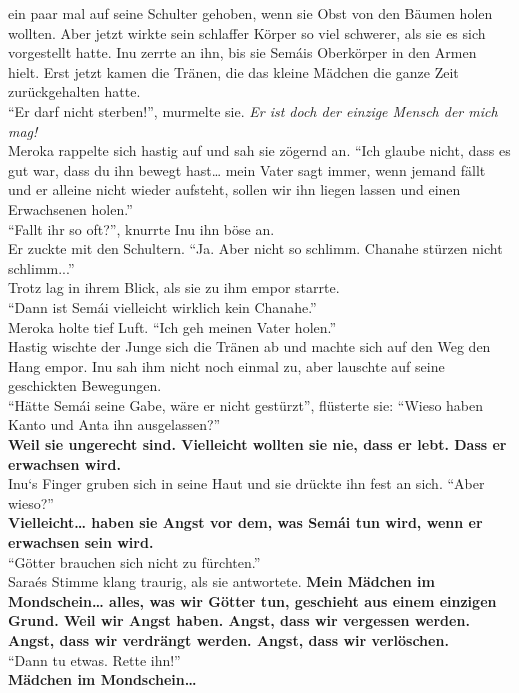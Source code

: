 \documentclass[a4paper,12pt]{book}
\begin{document}
ein paar mal auf seine Schulter gehoben, wenn sie Obst von den Bäumen holen wollten. Aber jetzt 
wirkte sein schlaffer Körper so viel schwerer, als sie es sich vorgestellt hatte. Inu zerrte an 
ihn, bis sie Semáis Oberkörper in den Armen hielt. Erst jetzt kamen die Tränen, die das kleine 
Mädchen die ganze Zeit zurückgehalten hatte.\\
``Er darf nicht sterben!'', murmelte sie. \textit{Er ist doch der einzige Mensch der mich mag!}\\
Meroka rappelte sich hastig auf und sah sie zögernd an. ``Ich glaube nicht, dass es gut war, dass 
du ihn bewegt hast… mein Vater sagt immer, wenn jemand fällt und er alleine nicht wieder aufsteht, 
sollen wir ihn liegen lassen und einen Erwachsenen holen.''\\
``Fallt ihr so oft?'', knurrte Inu ihn böse an.\\
Er zuckte mit den Schultern. ``Ja. Aber nicht so schlimm. Chanahe stürzen nicht schlimm...''\\
Trotz lag in ihrem Blick, als sie zu ihm empor starrte. \\
``Dann ist Semái vielleicht wirklich kein Chanahe.''\\
Meroka holte tief Luft. ``Ich geh meinen Vater holen.'' \\
Hastig wischte der Junge sich die Tränen ab und machte sich auf den Weg den Hang empor. Inu sah ihm 
nicht noch einmal zu, aber lauschte auf seine geschickten Bewegungen. \\
``Hätte Semái seine Gabe, wäre er nicht gestürzt'', flüsterte sie: ``Wieso haben Kanto und Anta 
ihn ausgelassen?''\\
\textbf{Weil sie ungerecht sind. Vielleicht wollten sie nie, dass er lebt. Dass er erwachsen 
wird.}\\
Inu‘s Finger gruben sich in seine Haut und sie drückte ihn fest an sich. ``Aber wieso?''\\
\textbf{Vielleicht… haben sie Angst vor dem, was Semái tun wird, wenn er erwachsen sein wird.}\\
``Götter brauchen sich nicht zu fürchten.''\\
Saraés Stimme klang traurig, als sie antwortete. \textbf{Mein Mädchen im Mondschein… alles, was wir 
Götter tun, geschieht aus einem einzigen Grund. Weil wir Angst haben. Angst, dass wir vergessen 
werden. Angst, dass wir verdrängt werden. Angst, dass wir verlöschen.}\\
``Dann tu etwas. Rette ihn!''\\
\textbf{Mädchen im Mondschein…}\\
\end{document}
